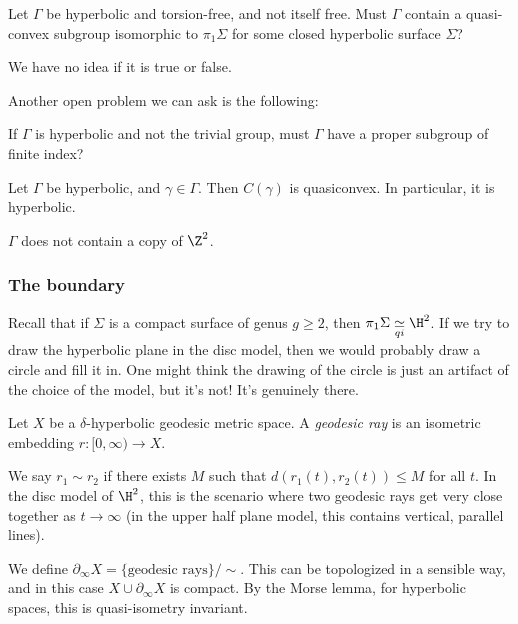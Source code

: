 \documentclass[a4paper]{article}
\newcommand{\qi}{\underset{qi}{\simeq}}
\begin{document}
\begin{question}
  Let $\Gamma$ be hyperbolic and torsion-free, and not itself free.  Must $\Gamma$ contain a quasi-convex subgroup isomorphic to $\pi_1 \Sigma$ for some closed hyperbolic surface $\Sigma$?
\end{question}
We have no idea if it is true or false.

Another open problem we can ask is the following:
\begin{question}
  If $\Gamma$ is hyperbolic and not the trivial group, must $\Gamma$ have a proper subgroup of finite index?
\end{question}

\begin{prop}
  Let $\Gamma$ be hyperbolic, and $\gamma \in \Gamma$. Then $C(\gamma)$ is quasiconvex. In particular, it is hyperbolic.
\end{prop}

\begin{cor}
  $\Gamma$ does not contain a copy of $\Z^2$.
\end{cor}

\subsubsection*{The boundary}
Recall that if $\Sigma$ is a compact surface of genus $g \geq 2$, then $\pi_1 \Sigma \qi \H^2$. If we try to draw the hyperbolic plane in the disc model, then we would probably draw a circle and fill it in. One might think the drawing of the circle is just an artifact of the choice of the model, but it's not! It's genuinely there.

\begin{defi}
  Let $X$ be a $\delta$-hyperbolic geodesic metric space. A \emph{geodesic ray} is an isometric embedding $r: [0, \infty) \to X$. 
\end{defi}

We say $r_1 \sim r_2$ if there exists $M$ such that $d(r_1(t), r_2(t)) \leq M$ for all $t$. In the disc model of $\H^2$, this is the scenario where two geodesic rays get very close together as $t \to \infty$ (in the upper half plane model, this contains vertical, parallel lines).

We define $\partial_\infty X = \{\text{geodesic rays}\}/\sim$. This can be topologized in a sensible way, and in this case $X \cup \partial_\infty X$ is compact. By the Morse lemma, for hyperbolic spaces, this is quasi-isometry invariant.
\end{document}
